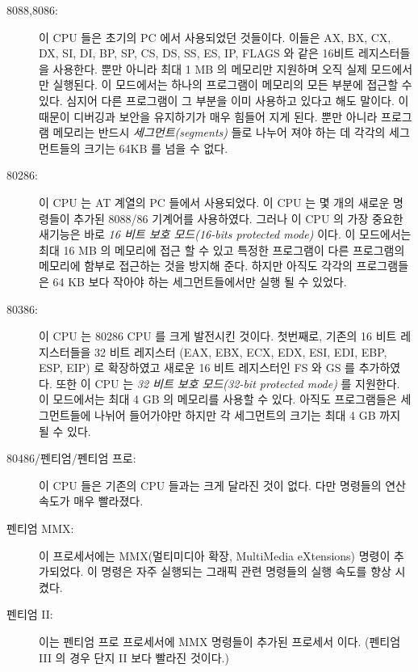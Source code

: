 \begin{description}

\item[8088,8086:]   
이 CPU 들은 초기의 PC 에서 사용되었던 것들이다. 이들은 AX, BX, CX, DX, SI, DI, BP, SP, CS, DS, SS,
ES, IP, FLAGS 와 같은 16비트 레지스터들을 사용한다. 뿐만 아니라 최대 1 MB 의 메모리만 지원하며 오직 
실제 모드에서만 실행된다. 이 모드에서는 하나의 프로그램이 메모리의 모든 부분에 접근할 수 있다. 심지어
다른 프로그램이 그 부분을 이미 사용하고 있다고 해도 말이다. 이 때문이 디버깅과 보안을 유지하기가 매우
힘들어 지게 된다. 뿐만 아니라 프로그램 메모리는 반드시 \emph{세그먼트(segments)} 들로 나누어 져야 하는
데 각각의 세그먼트들의 크기는 64KB 를 넘을 수 없다. 

\item[80286:] 
이 CPU 는 AT 계열의 PC 들에서 사용되었다. 이 CPU 는 몇 개의 새로운 명령들이 추가된 8088/86 기계어를 
사용하였다. 그러나 이 CPU 의 가장 중요한 새기능은 바로 \emph{16 비트 보호 모드(16-bits protected mode)} 이다. 
이 모드에서는 최대 16 MB 의 메모리에 접근 할 수 있고 특정한 프로그램이 다른 프로그램의 메모리에 함부로
접근하는 것을 방지해 준다. 하지만 아직도 각각의 프로그램들은 64 KB 보다 작아야 하는 세그먼트들에서만 실행 될 수 있었다.

\item[80386:] 
이 CPU 는 80286 CPU 를 크게 발전시킨 것이다. 첫번째로, 기존의 16 비트 레지스터들을 32 비트 레지스터
(EAX, EBX, ECX, EDX, ESI, EDI, EBP, ESP, EIP) 로 확장하였고 새로운 16 비트 레지스터인 FS 와 GS 를 추가하였다.
또한 이 CPU 는 \emph{32 비트 보호 모드(32-bit protected mode)} 를 지원한다. 이 모드에서는 최대 4 GB 의 메모리를
사용할 수 있다. 아직도 프로그램들은 세그먼트들에 나뉘어 들어가야만 하지만 각 세그먼트의 크기는 최대
4 GB 까지 될 수 있다.  

\item[80486/펜티엄/펜티엄 프로:]
이 CPU 들은 기존의 CPU 들과는 크게 달라진 것이 없다. 다만 명령들의 연산속도가 매우 빨라졌다.

\item[펜티엄 MMX:] 
이 프로세서에는 MMX(멀티미디아 확장, MultiMedia eXtensions) 명령이 추가되었다. 이 명령은 자주 실행되는
그래픽 관련 명령들의 실행 속도를 향상 시켰다. 

\item[펜티엄 II:] 
이는 펜티엄 프로 프로세서에 MMX 명령들이 추가된 프로세서 이다. (펜티엄 III 의 경우 단지 II 보다 빨라진 것이다.) 

\end{description}

